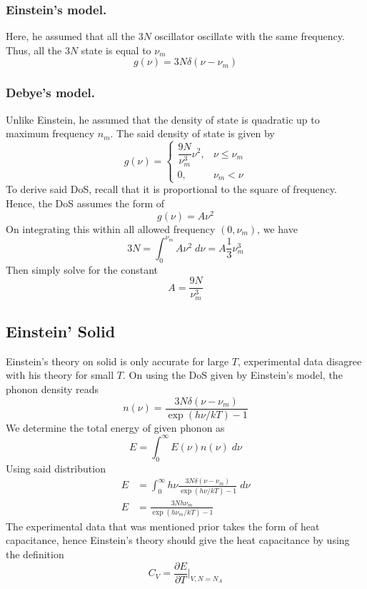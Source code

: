 \documentclass[../../../Main.tex]{subfiles}
\begin{document}
\subsubsection{Einstein's model.} Here, he assumed that all the $3N$ oscillator oscillate with the same frequency. Thus, all the $3N$ state is equal to $\nu_m$
\begin{equation*}
    g(\nu)=3N\delta(\nu-\nu_m)
\end{equation*}

\subsubsection{Debye's model.} Unlike Einstein, he assumed that the density of state is quadratic up to maximum frequency $n_m$. The said density of state is given by 
\begin{equation*}
    g(\nu)=\begin{cases}
        \dfrac{9N}{\nu_m^3}\nu^2,&\nu\leq\nu_m\\
        0,&\nu_m<\nu
    \end{cases}
\end{equation*}
To derive said DoS, recall that it is proportional to the square of frequency. Hence, the DoS assumes the form of 
\begin{equation*}
    g(\nu)=A\nu^2
\end{equation*}
On integrating this within all allowed frequency $(0,\nu_m)$, we have 
\begin{equation*}
    3N=\int_{0}^{\nu_m}A\nu^2\;d\nu=A\frac{1}{3}\nu_m^3
\end{equation*}
Then simply solve for the constant 
\begin{equation*}
    A=\frac{9N}{\nu_m^3}
\end{equation*}

\subsection{Einstein' Solid}
Einstein's theory on solid is only accurate for large $T$, experimental data disagree with his theory for small $T$. On using the DoS given by Einstein's model, the phonon density reads 
\begin{equation*}
    n(\nu)=\frac{3N\delta(\nu-\nu_m)}{\exp(h\nu/kT)-1}
\end{equation*}
We determine the total energy of given phonon as 
\begin{equation*}
    E=\int_{0}^{\infty}E(\nu)n(\nu)\;d\nu
\end{equation*}
Using said distribution
\begin{align*}
    E&=\int_{0}^{\infty}h\nu \frac{3N\delta(\nu-\nu_m)}{\exp(h\nu/kT)-1}\;d\nu\\
    E&=\frac{3Nh\nu_m}{\exp(h\nu_m/kT)-1}
\end{align*}
The experimental data that was mentioned prior takes the form of heat capacitance, hence Einstein's theory should give the heat capacitance by using the definition 
\begin{equation*}
    C_V=\frac{\partial E}{\partial T}\bigg|_{V,N=N_A}
\end{equation*}
\end{document}
